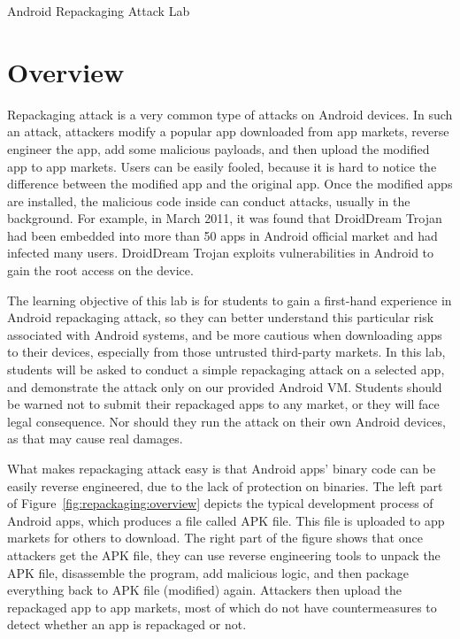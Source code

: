 



\newcommand{\repackFigs}{./Figs}








\begin{center}
{\LARGE Android Repackaging Attack Lab}
\end{center}




\section{Overview}


Repackaging attack is a very common type of attacks on Android devices. 
In such an attack, attackers modify a popular app downloaded from app
markets, reverse engineer the app, add some malicious payloads, and then
upload the modified app to app markets. Users can be easily fooled, because
it is hard to notice the difference between the modified app and the
original app. Once the modified apps are installed, the malicious code
inside can conduct attacks, usually in the background. 
For example, in March 2011, it was found that DroidDream Trojan had
been embedded into more than 50 apps in Android official market and had
infected many users. DroidDream Trojan exploits vulnerabilities in Android
to gain the root access on the device. 


The learning objective of this lab is for students to gain a first-hand
experience in Android repackaging attack, so they can better understand 
this particular risk associated with Android systems, and be more cautious
when downloading apps to their devices, especially from those untrusted
third-party markets. In this lab, students will be
asked to conduct a simple repackaging attack on a selected app, and
demonstrate the attack only on our provided Android VM. Students should be warned not to
submit their repackaged apps to any market, or they will face legal
consequence. Nor should they run the attack on their own Android devices,
as that may cause real damages.


What makes repackaging attack easy is that Android apps' binary code can be easily reverse 
engineered, due to the lack of protection on binaries.  
The left part of Figure~\ref{fig:repackaging:overview} depicts the typical
development process of Android apps, which produces a file called APK file.
This file is uploaded to app markets for others to download. 
The right part of the figure shows that once attackers get the APK
file, they can use reverse engineering tools to unpack the APK file, 
disassemble the program, add malicious logic, and then package
everything back to APK file (modified) again. 
Attackers then upload the repackaged app to app markets, most of which do
not have countermeasures to detect whether an app is repackaged or not.  


